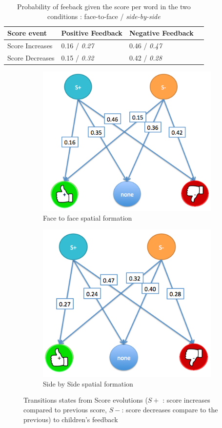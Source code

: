 \documentclass[letterpaper, 10 pt, conference]{ieeeconf}  %
\begin{document}
\begin{table}[ht!]
\centering
\caption{\small Probability of feeback given the score per word in  the two conditions : face-to-face / \emph{side-by-side}}
\label{proba}
\begin{tabular}{l|p{2cm}|p{2cm}l@{}}
\toprule
Score event & Positive Feedback & Negative Feedback \\
\midrule
Score Increases & 	0.16 / \emph{0.27}	& 0.46 / \emph{0.47} \\
Score Decreases &	0.15 / \emph{0.32}	& 0.42 / \emph{0.28} \\
\bottomrule
\end{tabular}
\end{table}
\begin{figure}
	\centering
	\begin{subfigure}{0.5\textwidth}
		\centering
		\includegraphics[width=0.8\linewidth]{./figures/faceface_score}
		\caption{Face to face spatial formation}
		\label{fig:f2fstate}
	\end{subfigure}%
	\begin{subfigure}{0.5\textwidth}
		\centering
		\includegraphics[width=0.8\linewidth]{./figures/sidebiside_score}
		\caption{Side by Side spatial formation}
		\label{fig:sbsstate}
	\end{subfigure}
	\caption{Transitions states from Score evolutions ($S+$ : score increases compared to previous score, $S-$: score decreases compare to the previous) to children's feedback}
	\label{fig:state}
\end{figure}
\end{document}
